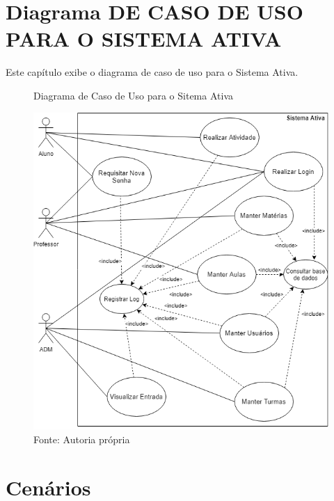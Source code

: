\documentclass{utfpr-pg}
\begin{document}
\chapter{Diagrama DE CASO DE USO PARA O SISTEMA ATIVA}
  \label{chapter:diagrama de cado de uso para o sistema ativa}
  Este capítulo exibe o diagrama de caso de uso para o Sistema Ativa.
    \begin{figure}[H]
            \centering
            \captionsetup{width=0.9\textwidth}
            \caption{Diagrama de Caso de Uso para o Sitema Ativa}
            \includegraphics[width=\linewidth]{fotos/Diagrama.png}
            \caption*{Fonte: Autoria própria}
            \label{fig:Diagrama de Caso de Uso}
        \end{figure}
 
 
\chapter{Cenários}
    \label{chapter:cenario}
\end{document}
